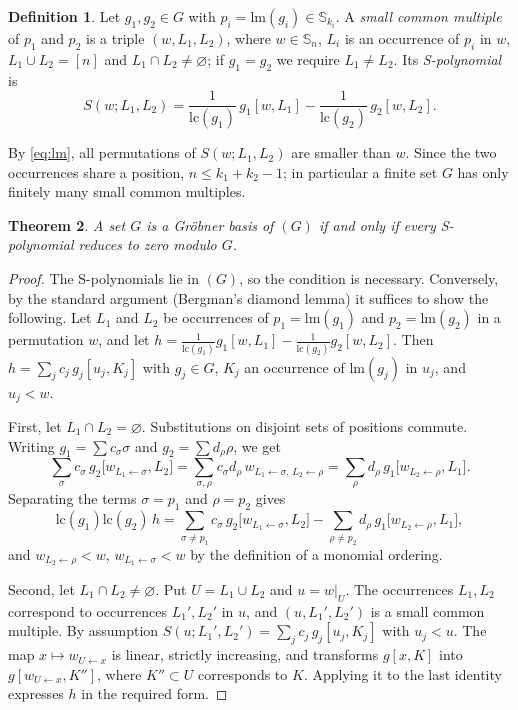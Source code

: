 \documentclass[11pt]{amsart}
\newtheorem{theorem}{Theorem}[section]
\theoremstyle{definition}
\newtheorem{definition}[theorem]{Definition}
\theoremstyle{remark}
\newcommand{\bS}{\mathbb{S}}
\newcommand{\lm}{\mathrm{lm}}
\newcommand{\lc}{\mathrm{lc}}
\begin{document}
\begin{definition}
Let $g_1,g_2\in G$ with $p_i=\lm(g_i)\in\bS_{k_i}$. A \emph{small common multiple} of $p_1$ and $p_2$ is a triple $(w,L_1,L_2)$, where $w\in\bS_n$, $L_i$ is an occurrence of $p_i$ in $w$, $L_1\cup L_2=[n]$ and $L_1\cap L_2\ne\varnothing$; if $g_1=g_2$ we require $L_1\ne L_2$. Its \emph{S-polynomial} is
\[
S(w;L_1,L_2)=\frac{1}{\lc(g_1)}\,g_1[w,L_1]-\frac{1}{\lc(g_2)}\,g_2[w,L_2].
\]
\end{definition}

By \eqref{eq:lm}, all permutations of $S(w;L_1,L_2)$ are smaller than $w$. Since the two occurrences share a position, $n\le k_1+k_2-1$; in particular a finite set $G$ has only finitely many small common multiples.

\begin{theorem}\label{thm:buchberger}
A set $G$ is a Gr\"obner basis of $(G)$ if and only if every S-polynomial reduces to zero modulo $G$.
\end{theorem}

\begin{proof}
The S-polynomials lie in $(G)$, so the condition is necessary. Conversely, by the standard argument (Bergman's diamond lemma) it suffices to show the following. Let $L_1$ and $L_2$ be occurrences of $p_1=\lm(g_1)$ and $p_2=\lm(g_2)$ in a permutation $w$, and let $h=\frac1{\lc(g_1)}g_1[w,L_1]-\frac1{\lc(g_2)}g_2[w,L_2]$. Then $h=\sum_j c_j\,g_{j}[u_j,K_j]$ with $g_j\in G$, $K_j$ an occurrence of $\lm(g_j)$ in $u_j$, and $u_j<w$.

First, let $L_1\cap L_2=\varnothing$. Substitutions on disjoint sets of positions commute. Writing $g_1=\sum c_\sigma\sigma$ and $g_2=\sum d_\rho\rho$, we get
\[
\sum_{\sigma}c_\sigma\,g_2\bigl[w_{L_1\leftarrow\sigma},L_2\bigr]=\sum_{\sigma,\rho}c_\sigma d_\rho\,w_{L_1\leftarrow\sigma,\,L_2\leftarrow\rho}=\sum_\rho d_\rho\,g_1\bigl[w_{L_2\leftarrow\rho},L_1\bigr].
\]
Separating the terms $\sigma=p_1$ and $\rho=p_2$ gives
\[
\lc(g_1)\lc(g_2)\,h=\sum_{\sigma\ne p_1}c_\sigma\,g_2\bigl[w_{L_1\leftarrow\sigma},L_2\bigr]-\sum_{\rho\ne p_2}d_\rho\,g_1\bigl[w_{L_2\leftarrow\rho},L_1\bigr],
\]
and $w_{L_2\leftarrow\rho}<w$, $w_{L_1\leftarrow\sigma}<w$ by the definition of a monomial ordering.

Second, let $L_1\cap L_2\ne\varnothing$. Put $U=L_1\cup L_2$ and $u=w|_U$. The occurrences $L_1,L_2$ correspond to occurrences $L_1',L_2'$ in $u$, and $(u,L_1',L_2')$ is a small common multiple. By assumption $S(u;L_1',L_2')=\sum_j c_j\,g_j[u_j,K_j]$ with $u_j<u$. The map $x\mapsto w_{U\leftarrow x}$ is linear, strictly increasing, and transforms $g[x,K]$ into $g[w_{U\leftarrow x},K'']$, where $K''\subset U$ corresponds to $K$. Applying it to the last identity expresses $h$ in the required form.
\end{proof}
\end{document}
